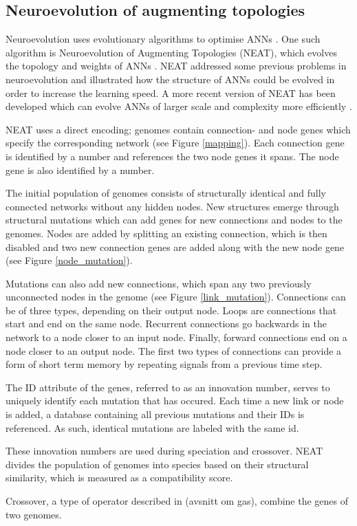 \newpage

\subsection{Neuroevolution of augmenting topologies}
Neuroevolution uses evolutionary algorithms to optimise ANNs \cite{neuroevolution_review}.
One such algorithm is Neuroevolution of Augmenting Topologies (NEAT), which evolves the topology and weights of ANNs
\cite{neat_main, neat_short, neat_phd}.
NEAT addressed some previous problems in neuroevolution and illustrated how the structure of ANNs could be
evolved in order to increase the learning speed. A more recent version of NEAT has been developed which can evolve ANNs of larger scale and
complexity more efficiently \cite{hyper_neat}.

NEAT uses a direct encoding; genomes contain connection- and node genes which specify the corresponding
network (see Figure \ref{mapping}). Each connection gene is identified by a number and
references the two node genes it spans. The node gene is also identified by a number.



The initial population of genomes consists of structurally identical and fully connected networks without any hidden nodes.
New structures emerge through structural mutations which can add genes for new connections and nodes to the genomes.
Nodes are added by splitting an existing connection, which is then disabled and two new connection genes are added along
with the new node gene (see Figure \ref{node_mutation}).



Mutations can also add new connections, which span any two previously unconnected nodes in the genome (see Figure \ref{link_mutation}).
Connections can be of three types, depending on their output node. Loops are connections that start and end on the same node. Recurrent
connections go backwards in the network to a node closer to an input node. Finally, forward connections end on a node closer to an output
node. The first two types of connections can provide a form of short term memory by repeating signals from a previous time step.



The ID attribute of the genes, referred to as an innovation number, serves to uniquely identify each mutation that has occured.
Each time a new link or node is added, a database containing all previous mutations and their IDs is referenced.
As such, identical mutations are labeled with the same id.

These innovation numbers are used during speciation and crossover. NEAT divides the population of genomes into species based on their structural
similarity, which is measured as a compatibility score.

Crossover, a type of operator described in (avsnitt om gas), combine the genes of two genomes.



